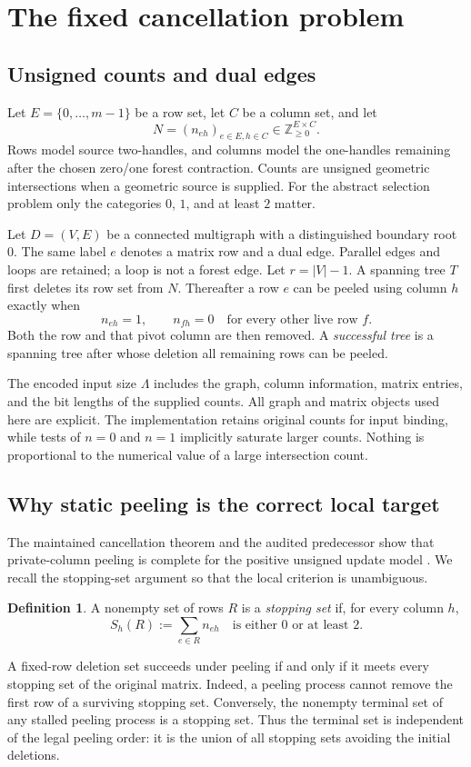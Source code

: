 \documentclass[11pt,letterpaper]{article}
\theoremstyle{definition}
\newtheorem{definition}[theorem]{Definition}
\begin{document}
\section{The fixed cancellation problem}\label{sec:model}
\subsection{Unsigned counts and dual edges}
Let $E=\{0,\ldots,m-1\}$ be a row set, let $C$ be a column set, and let
\[
 N=(n_{eh})_{e\in E,h\in C}\in\mathbb Z_{\geq0}^{E\times C}.
\]
Rows model source two-handles, and columns model the one-handles remaining
after the chosen zero/one forest contraction. Counts are unsigned geometric
intersections when a geometric source is supplied. For the abstract selection
problem only the categories $0$, $1$, and at least $2$ matter.

Let $D=(V,E)$ be a connected multigraph with a distinguished boundary root
$0$. The same label $e$ denotes a matrix row and a dual edge. Parallel edges
and loops are retained; a loop is not a forest edge. Let $r=|V|-1$. A spanning
tree $T$ first deletes its row set from $N$. Thereafter a row $e$ can be peeled
using column $h$ exactly when
\begin{equation}\label{eq:private}
 n_{eh}=1,\qquad n_{fh}=0\quad\text{for every other live row }f.
\end{equation}
Both the row and that pivot column are then removed. A \emph{successful tree}
is a spanning tree after whose deletion all remaining rows can be peeled.

The encoded input size $\Lambda$ includes the graph, column information,
matrix entries, and the bit lengths of the supplied counts. All graph and
matrix objects used here are explicit. The implementation retains original
counts for input binding, while tests of $n=0$ and $n=1$ implicitly saturate
larger counts. Nothing is proportional to the numerical value of a large
intersection count.

\subsection{Why static peeling is the correct local target}
The maintained cancellation theorem and the audited predecessor show that
private-column peeling is complete for the positive unsigned update model
\cite{peeling,prior}. We recall the stopping-set argument so that the local
criterion is unambiguous.

\begin{definition}
A nonempty set of rows $R$ is a \emph{stopping set} if, for every column $h$,
\[
 S_h(R):=\sum_{e\in R}n_{eh}\quad\text{is either }0\text{ or at least }2.
\]
\end{definition}
A fixed-row deletion set succeeds under peeling if and only if it meets every
stopping set of the original matrix. Indeed, a peeling process cannot remove
the first row of a surviving stopping set. Conversely, the nonempty terminal
set of any stalled peeling process is a stopping set. Thus the terminal set
is independent of the legal peeling order: it is the union of all stopping
sets avoiding the initial deletions.
\end{document}

